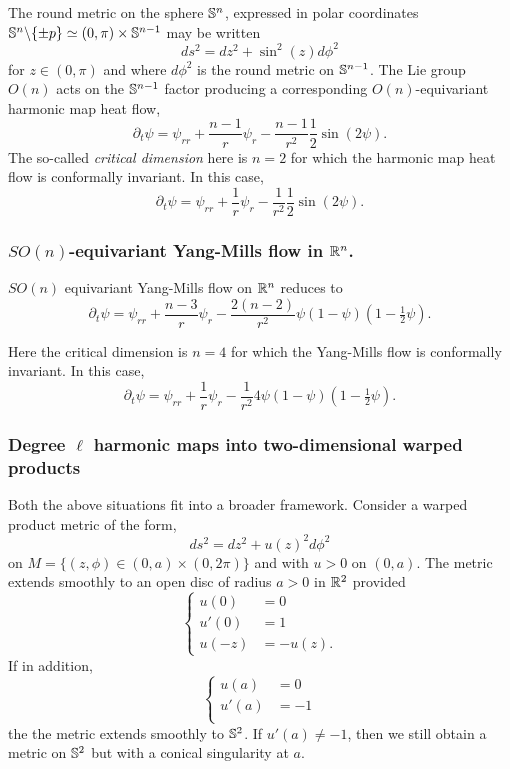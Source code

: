 \documentclass{amsart}
\begin{document}
The round metric on the sphere \(\S^n\), expressed in polar coordinates \(\S^n \backslash \{\pm p\} \simeq (0, \pi) \times \S^{n-1}\) may be written
\[
ds^2 = dz^2 + \sin^2(z) d\phi^2
\]
for \(z \in (0, \pi)\) and where \(d\phi^2\) is the round metric on \(\S^{n-1}\). The Lie group \(O(n)\) acts on the \(\S^{n-1}\) factor producing a corresponding \(O(n)\)-equivariant harmonic map heat flow,
\[
\partial_t \psi = \psi_{rr} + \frac{n-1}{r} \psi_r - \frac{n-1}{r^2} \frac{1}{2} \sin (2\psi).
\]
The so-called \emph{critical dimension} here is \(n=2\) for which the harmonic map heat flow is conformally invariant. In this case,
\[
\partial_t \psi = \psi_{rr} + \frac{1}{r} \psi_r - \frac{1}{r^2} \frac{1}{2} \sin (2\psi).
\]

\subsubsection*{\(SO(n)\)-equivariant Yang-Mills flow in \(\R^n\).}

\(SO(n)\) equivariant Yang-Mills flow on \(\R^n\) reduces to
\[
\partial_t \psi = \psi_{rr} + \frac{n-3}{r} \psi_r - \frac{2(n-2)}{r^2} \psi(1 - \psi)(1 - \tfrac{1}{2} \psi).
\]

Here the critical dimension is \(n=4\) for which the Yang-Mills flow is conformally invariant. In this case,
\[
\partial_t \psi = \psi_{rr} + \frac{1}{r} \psi_r - \frac{1}{r^2} 4 \psi(1 - \psi)(1 - \tfrac{1}{2} \psi).
\]

\subsubsection*{Degree \(\ell\) harmonic maps into two-dimensional warped products}

Both the above situations fit into a broader framework. Consider a warped product metric of the form,
\[
ds^2 = dz^2 + u(z)^2 d\phi^2
\]
on $M = \{(z,\phi) \in (0, a) \times (0, 2\pi)\}$ and with \(u > 0\) on \((0, a)\). The metric extends smoothly to an open disc of radius $a > 0$ in $\R^2$ provided
\[
\begin{cases}
u(0) &= 0 \\
u'(0) &= 1 \\
u(-z) &= - u(z).
\end{cases}
\]
If in addition,
\[
\begin{cases}
u(a) &= 0 \\
u'(a) &= -1 \\
\end{cases}
\]
the the metric extends smoothly to $\S^2$. If $u'(a) \ne -1$, then we still obtain a metric on $\S^2$ but with a conical singularity at $a$.
\end{document}
